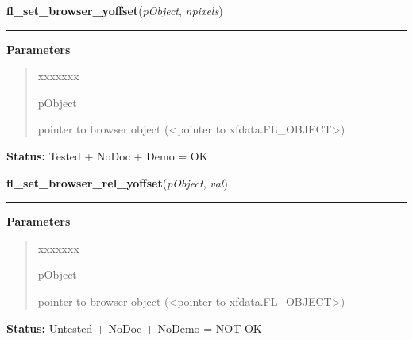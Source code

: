 \hspace{.8\funcindent}\begin{boxedminipage}{\funcwidth}

    \raggedright \textbf{fl\_set\_browser\_yoffset}(\textit{pObject}, \textit{npixels})

    \vspace{-1.5ex}

    \rule{\textwidth}{0.5\fboxrule}
\setlength{\parskip}{2ex}
\setlength{\parskip}{1ex}
      \textbf{Parameters}
      \vspace{-1ex}

      \begin{quote}
        \begin{Ventry}{xxxxxxx}

          \item[pObject]

          pointer to browser object ({\textless}pointer to 
          xfdata.FL\_OBJECT{\textgreater})

        \end{Ventry}

      \end{quote}

\textbf{Status:} Tested + NoDoc + Demo = OK



    \end{boxedminipage}

    \label{xformslib:library:fl_set_browser_rel_yoffset}

    \vspace{0.5ex}

\hspace{.8\funcindent}\begin{boxedminipage}{\funcwidth}

    \raggedright \textbf{fl\_set\_browser\_rel\_yoffset}(\textit{pObject}, \textit{val})

    \vspace{-1.5ex}

    \rule{\textwidth}{0.5\fboxrule}
\setlength{\parskip}{2ex}
\setlength{\parskip}{1ex}
      \textbf{Parameters}
      \vspace{-1ex}

      \begin{quote}
        \begin{Ventry}{xxxxxxx}

          \item[pObject]

          pointer to browser object ({\textless}pointer to 
          xfdata.FL\_OBJECT{\textgreater})

        \end{Ventry}

      \end{quote}

\textbf{Status:} Untested + NoDoc + NoDemo = NOT OK



    \end{boxedminipage}

